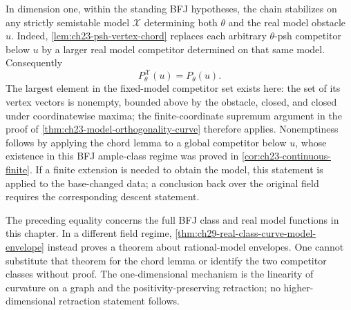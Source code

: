 In dimension one, within the standing BFJ hypotheses, the chain
stabilizes on any strictly semistable model \(\mathcal X\)
determining both \(\theta\) and the real model obstacle \(u\).
Indeed, \cref{lem:ch23-psh-vertex-chord} replaces each arbitrary
\(\theta\)-psh competitor below \(u\) by a larger real model
competitor determined on that same model.  Consequently
\[
                    P^{\mathcal X}_\theta(u)=P_\theta(u).
\]
The largest element in the fixed-model competitor set exists here:
the set of its vertex vectors is nonempty, bounded above by the
obstacle, closed, and closed under coordinatewise maxima; the
finite-coordinate supremum argument in the proof of
\cref{thm:ch23-model-orthogonality-curve} therefore applies.
Nonemptiness follows by applying the chord lemma to a global
competitor below \(u\), whose existence in this BFJ ample-class
regime was proved in \cref{cor:ch23-continuous-finite}.
If a finite extension is needed to obtain the model, this statement
is applied to the base-changed data; a conclusion back over the
original field requires the corresponding descent statement.

The preceding equality concerns the full BFJ class and real model
functions in this chapter.  In a different field regime,
\cref{thm:ch29-real-class-curve-model-envelope} instead proves a
theorem about rational-model envelopes.  One cannot substitute
that theorem for the chord lemma or identify the two competitor
classes without proof.  The one-dimensional mechanism is the
linearity of curvature on a graph and the positivity-preserving
retraction; no higher-dimensional retraction statement follows.

